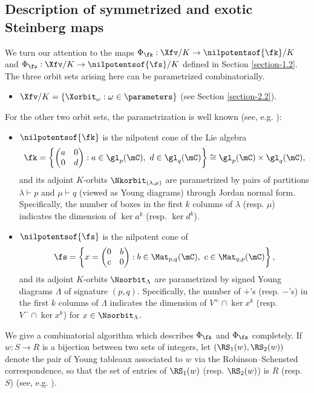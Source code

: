 \subsection{Description of symmetrized and exotic Steinberg maps}

\label{section-2.3}


We turn our attention to the maps $\Phi_\fk:\Xfv/K\to \nilpotentsof{\fk}/K$ and $\Phi_\fs:\Xfv/K\to\nilpotentsof{\fs}/K$ defined in Section \ref{section-1.2}.
The three orbit sets arising here can be parametrized combinatorially.
\begin{itemize}
\item $\Xfv/K=\{\Xorbit_\omega:\omega\in\parameters\}$ (see Section \ref{section-2.2}).
\end{itemize}
For the other two orbit sets, the parametrization is well known (see, e.g. \cite{Collingwood-McGovern}):
\begin{itemize}
\item $\nilpotentsof{\fk}$ is the nilpotent cone of the Lie algebra
$$\fk=\left\{\begin{pmatrix} a & 0\\ 0 &
d\end{pmatrix}:a\in\gl_p(\mC),\
d\in\gl_q(\mC)\right\}\cong\gl_p(\mC)\times\gl_q(\mC),$$
and its adjoint
$K$-orbits $\Nkorbit_{(\lambda,\mu)}$ are parametrized by pairs of
partitions $\lambda\vdash p$ and $\mu\vdash q$ (viewed as Young
diagrams) through Jordan normal form. Specifically, the number of
boxes in the first $k$ columns of $\lambda$ (resp. $\mu$) indicates
the dimension of $\ker a^k$ (resp. $\ker d^k$).
\item $\nilpotentsof{\fs}$ is the nilpotent cone of
$$\fs=\left\{x=\begin{pmatrix} 0 & b\\ c &
0\end{pmatrix}:b\in\Mat_{p,q}(\mC),\ c\in\Mat_{q,p}(\mC)\right\},$$
and
its adjoint $K$-orbits $\Nsorbit_{\Lambda}$ are parametrized by
signed Young diagrams $\Lambda$ of signature $(p,q)$. Specifically,
the number of $+$'s (resp. $-$'s) in the first $k$ columns of
$\Lambda$ indicates the dimension of $V^+\cap\ker x^k$ (resp.
$V^-\cap\ker x^k$) for $x\in\Nsorbit_\Lambda$.

\end{itemize}

We give a combinatorial algorithm which describes $\Phi_\fk$ and $\Phi_\fs$ completely. If $w:S\to R$ is a bijection
between two sets of integers, let $(\RS_1(w),\RS_2(w))$ denote the
pair of Young tableaux associated to $w$ via the Robinson--Schensted
correspondence, so that the set of entries of $\RS_1(w)$ (resp.
$\RS_2(w)$) is $R$ (resp. $S$) (see, e.g. \cite{Fulton}).





